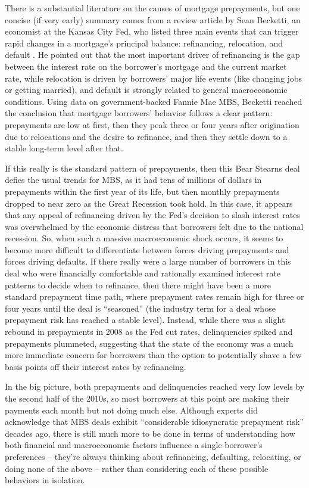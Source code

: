 \documentclass[12pt]{article}
\begin{document}
	There is a substantial literature on the causes of mortgage prepayments, but one concise (if very early) summary comes from a review article by Sean Becketti, an economist at the Kansas City Fed, who listed three main events that can trigger rapid changes in a mortgage’s principal balance: refinancing, relocation, and default \parencite{becketti89}. He pointed out that the most important driver of refinancing is the gap between the interest rate on the borrower's mortgage and the current market rate, while relocation is driven by borrowers’ major life events (like changing jobs or getting married), and default is strongly related to general macroeconomic conditions. Using data on government-backed Fannie Mae MBS, Becketti reached the conclusion that mortgage borrowers’ behavior follows a clear pattern: prepayments are low at first, then they peak three or four years after origination due to relocations and the desire to refinance, and then they settle down to a stable long-term level after that.
	
If this really is the standard pattern of prepayments, then this Bear Stearns deal defies the usual trends for MBS, as it had tens of millions of dollars in prepayments within the first year of its life, but then monthly prepayments dropped to near zero as the Great Recession took hold.  In this case, it appears that any appeal of refinancing driven by the Fed's decision to slash interest rates was overwhelmed by the economic distress that borrowers felt due to the national recession. So, when such a massive macroeconomic shock occurs, it seems to become more difficult to differentiate between forces driving prepayments and forces driving defaults. If there really were a large number of borrowers in this deal who were financially comfortable and rationally examined interest rate patterns to decide when to refinance, then there might have been a more standard prepayment time path, where prepayment rates remain high for three or four years until the deal is “seasoned” (the industry term for a deal whose prepayment risk has reached a stable level). Instead, while there was a slight rebound in prepayments in 2008 as the Fed cut rates, delinquencies spiked and prepayments plummeted, suggesting that the state of the economy was a much more immediate concern for borrowers than the option to potentially shave a few basis points off their interest rates by refinancing.

In the big picture, both prepayments and delinquencies reached very low levels by the second half of the 2010s, so most borrowers at this point are making their payments each month but not doing much else. Although experts did acknowledge that MBS deals exhibit “considerable idiosyncratic prepayment risk” \parencite{becketti89} decades ago, there is still much more to be done in terms of understanding how both financial and macroeconomic factors influence a single borrower’s preferences – they’re always thinking about refinancing, defaulting, relocating, or doing none of the above – rather than considering each of these possible behaviors in isolation.
\end{document}
